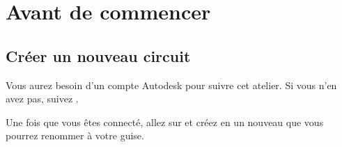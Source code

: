 \section{Avant de commencer}
\subsection{Créer un nouveau circuit}
Vous aurez besoin d'un compte Autodesk pour suivre cet atelier.
Si vous n'en avez pas, suivez .

Une fois que vous êtes connecté, allez sur  et créez en un nouveau que vous pourrez renommer à votre guise.